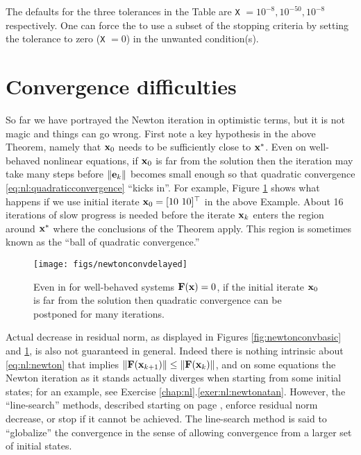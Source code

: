 \medskip
The defaults for the three tolerances in the Table are \texttt{X} $=10^{-8},10^{-50},10^{-8}$ respectively.  One can force the \pSNES to use a subset of the stopping criteria by setting the tolerance to zero (\texttt{X} $=0$) in the unwanted condition(s).


\section{Convergence difficulties} \label{sec:divergence}

So far we have portrayed the Newton iteration in optimistic terms, but it is not magic and things can go wrong.  First note a key hypothesis in the above Theorem, namely that $\mathbf{x}_0$ needs to be sufficiently close to $\mathbf{x}^*$.  Even on well-behaved nonlinear equations, if $\mathbf{x}_0$ is far from the solution then the iteration may take many steps before $\|\mathbf{e}_k\|$ becomes small enough so that quadratic convergence \eqref{eq:nl:quadraticconvergence} ``kicks in''.  For example, Figure \ref{fig:newtonconvdelayed} shows what happens if we use initial iterate $\mathbf{x}_0=[10\,\, 10]^\top$ in the above Example.  About 16 iterations of slow progress is needed before the iterate $\mathbf{x}_k$ enters the region around $\mathbf{x}^*$ where the conclusions of the Theorem apply.  This region is sometimes known as the ``ball of quadratic convergence.''

\begin{figure}
\texttt{[image: figs/newtonconvdelayed]}
\caption{Even in for well-behaved systems $\mathbf{F}(\mathbf{x})=0$, if the initial iterate $\mathbf{x}_0$ is far from the solution then quadratic convergence can be postponed for many iterations.}
\label{fig:newtonconvdelayed}
\end{figure}

Actual decrease in residual norm, as displayed in Figures \ref{fig:newtonconvbasic} and \ref{fig:newtonconvdelayed}, is also not guaranteed in general.  Indeed there is nothing intrinsic about \eqref{eq:nl:newton} that implies $\|\mathbf{F}(\mathbf{x}_{k+1})\| \le \|\mathbf{F}(\mathbf{x}_k)\|$, and on some equations the Newton iteration as it stands actually diverges when starting from some initial states; for an example, see Exercise \ref{chap:nl}.\ref{exer:nl:newtonatan}.  However, the ``line-search'' methods, described starting on page \pageref{sec:linesearch}, enforce residual norm decrease, or stop if it cannot be achieved.  The line-search method is said to ``globalize'' the convergence \citep{Kelley2003} in the sense of allowing convergence from a larger set of initial states.

